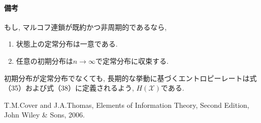 \documentclass[a4j]{jsarticle}
\begin{document}
\paragraph{備考}

もし, マルコフ連鎖が既約かつ非周期的であるなら,
\begin{enumerate}
	\item 状態上の定常分布は一意である.
	\item 任意の初期分布は$n \rightarrow \infty$で定常分布に収束する.
\end{enumerate}
初期分布が定常分布でなくても, 長期的な挙動に基づくエントロピーレートは式（35）および式（38）に定義されるよう, $H(\mathcal{X})$である.




\begin{thebibliography}{99}
	T.M.Cover and J.A.Thomas, Elements of Information Theory, Second Edition, John Wiley \& Sons, 2006.
\end{thebibliography}
\end{document}
